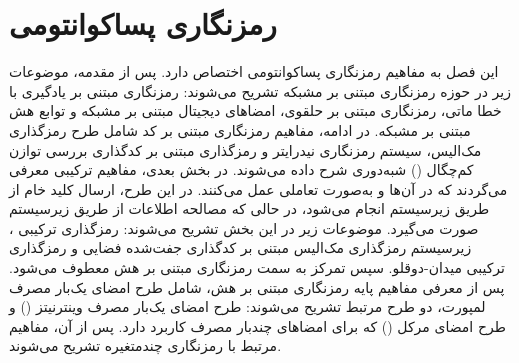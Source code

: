 
\chapter{رمزنگاری پسا‌کوانتومی}
\label{chap:12}


	این فصل به مفاهیم رمزنگاری پسا‌کوانتومی اختصاص دارد. پس از مقدمه، موضوعات زیر در حوزه رمزنگاری مبتنی بر مشبکه تشریح می‌شوند: رمزنگاری مبتنی بر یادگیری با خطا ماتی، رمزنگاری مبتنی بر  حلقوی، امضاهای دیجیتال مبتنی بر مشبکه و توابع هش مبتنی بر مشبکه. در ادامه، مفاهیم رمزنگاری مبتنی بر کد شامل طرح رمزگذاری مک‌الیس، سیستم رمزنگاری نیدرایتر و رمزگذاری مبتنی بر کدگذاری بررسی توازن کم‌چگال () شبه‌دوری شرح داده می‌شوند. در بخش بعدی، مفاهیم ترکیبی  معرفی می‌گردند که در آن‌ها  و  به‌صورت تعاملی عمل می‌کنند. در این طرح، ارسال کلید خام از طریق زیرسیستم  انجام می‌شود، در حالی که مصالحه اطلاعات از طریق زیرسیستم  صورت می‌گیرد. موضوعات زیر در این بخش تشریح می‌شوند: رمزگذاری ترکیبی ، زیرسیستم رمزگذاری مک‌الیس مبتنی بر کدگذاری  جفت‌شده فضایی و رمزگذاری ترکیبی  میدان-دوقلو. سپس تمرکز به سمت رمزنگاری مبتنی بر هش معطوف می‌شود. پس از معرفی مفاهیم پایه رمزنگاری مبتنی بر هش، شامل طرح امضای یک‌بار مصرف لمپورت، دو طرح مرتبط تشریح می‌شوند: طرح امضای یک‌بار مصرف وینترنیتز () و طرح امضای مرکل () که برای امضاهای چندبار مصرف کاربرد دارد. پس از آن، مفاهیم مرتبط با رمزنگاری چندمتغیره تشریح می‌شوند.


